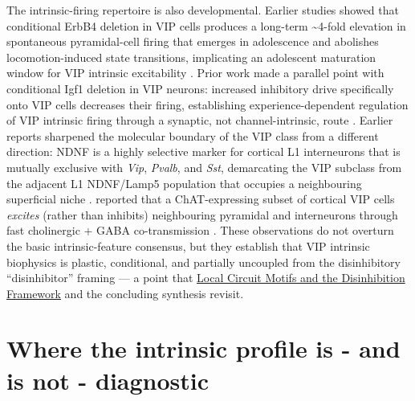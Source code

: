 \documentclass[11pt]{article}
\begin{document}
The intrinsic-firing repertoire is also developmental. Earlier studies showed that conditional ErbB4 deletion in VIP cells produces a long-term {\textasciitilde}4-fold elevation in spontaneous pyramidal-cell firing that emerges in adolescence and abolishes locomotion-induced state transitions, implicating an adolescent maturation window for VIP intrinsic excitability \citep{Batistabrito2017}. Prior work made a parallel point with conditional Igf1 deletion in VIP neurons: increased inhibitory drive specifically onto VIP cells decreases their firing, establishing experience-dependent regulation of VIP intrinsic firing through a synaptic, not channel-intrinsic, route \citep{Mardinly2016}. Earlier reports \citep{Abs2018} sharpened the molecular boundary of the VIP class from a different direction: NDNF is a highly selective marker for cortical L1 interneurons that is mutually exclusive with \textit{Vip}, \textit{Pvalb}, and \textit{Sst}, demarcating the VIP subclass from the adjacent L1 NDNF/Lamp5 population that occupies a neighbouring superficial niche \citep{Abs2018}. \citet{Obermayer2019} reported that a ChAT-expressing subset of cortical VIP cells \textit{excites} (rather than inhibits) neighbouring pyramidal and interneurons through fast cholinergic + GABA co-transmission \citep{Obermayer2019}. These observations do not overturn the basic intrinsic-feature consensus, but they establish that VIP intrinsic biophysics is plastic, conditional, and partially uncoupled from the disinhibitory ``disinhibitor'' framing \citep{Pi2013, Pfeffer2013, Karnani2016a} --- a point that \href{/disinhibition-framework}{Local Circuit Motifs and the Disinhibition Framework} and the concluding synthesis revisit.

\section{Where the intrinsic profile is - and is not - diagnostic}\label{sec-05-bridge}
\end{document}

